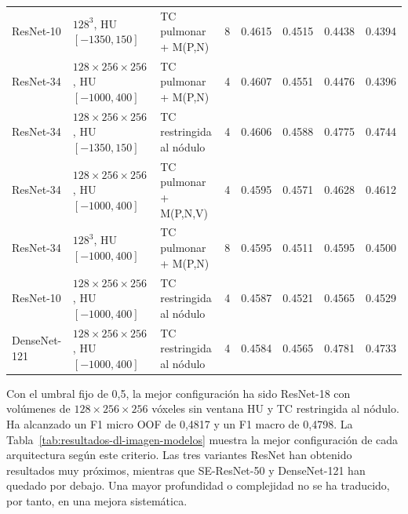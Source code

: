 \begin{table}[!htbp]
{\begin{tabular}{lllrcccc}
ResNet-10 & \(128^3\), HU \([-1350,150]\) & TC pulmonar + M(P,N) & 8 & 0.4615 & 0.4515 & 0.4438 & 0.4394 \\
ResNet-34 &  \(128\times256\times256\), HU \([-1000,400]\) & TC pulmonar + M(P,N) & 4 & 0.4607 & 0.4551 & 0.4476 & 0.4396 \\
ResNet-34 &  \(128\times256\times256\), HU \([-1350,150]\) & TC restringida al nódulo & 4 & 0.4606 & 0.4588 & 0.4775 & 0.4744 \\
ResNet-34 &  \(128\times256\times256\), HU \([-1000,400]\) & TC pulmonar + M(P,N,V) & 4 & 0.4595 & 0.4571 & 0.4628 & 0.4612 \\
ResNet-34 &  \(128^3\), HU \([-1000,400]\) & TC pulmonar + M(P,N) & 8 & 0.4595 & 0.4511 & 0.4595 & 0.4500 \\
ResNet-10 &  \(128\times256\times256\), HU \([-1000,400]\) & TC restringida al nódulo & 4 & 0.4587 & 0.4521 & 0.4565 & 0.4529 \\
DenseNet-121 &  \(128\times256\times256\), HU \([-1000,400]\) & TC restringida al nódulo & 4 & 0.4584 & 0.4565 & 0.4781 & 0.4733 \\
\bottomrule
\end{tabular}
}
\end{table}

Con el umbral fijo de 0,5, la mejor configuración ha sido ResNet-18 con volúmenes de $128 \times 256 \times 256$ vóxeles sin ventana HU y TC restringida al nódulo. Ha alcanzado un F1 micro OOF de 0,4817 y un F1 macro de 0,4798. La Tabla~\ref{tab:resultados-dl-imagen-modelos} muestra la mejor configuración de cada arquitectura según este criterio. Las tres variantes ResNet han obtenido resultados muy próximos, mientras que SE-ResNet-50 y DenseNet-121 han quedado por debajo. Una mayor profundidad o complejidad no se ha traducido, por tanto, en una mejora sistemática.

